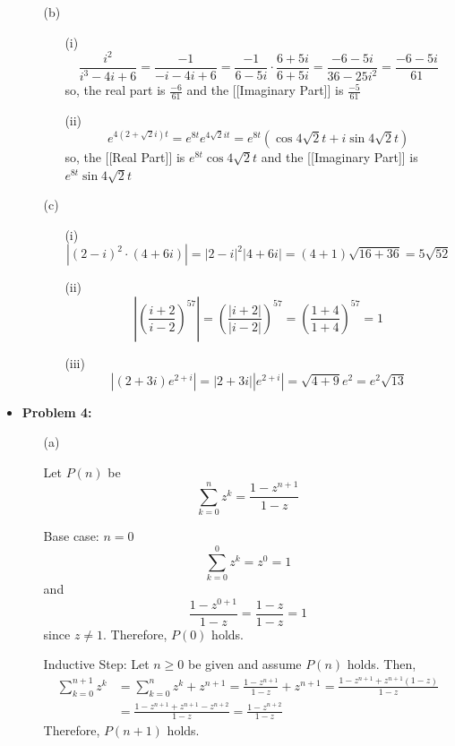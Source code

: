 \documentclass[12pt]{amsart}
\theoremstyle{definition}
\theoremstyle{remark}
\begin{document}
\begin{itemize}
\begin{itemize}
\vspace{0.1 cm}

\item[(b)] 
   \begin{itemize}
      \item[(i)] $$\frac{i^{2}}{i^{3}-4i+6}= \frac{-1}{-i-4i+6}= \frac{-1}{6-5i}\cdot \frac{6+5i}{6+5i}=\frac{-6-5i}{36-25i^{2}}= \frac{-6-5i}{61}$$so, the real part is $\frac{-6}{61}$ and the [[Imaginary Part]] is $\frac{-5}{61}$
        \vspace{0.1 cm}
      \item[(ii)]$$e^{4(2+\sqrt{2}i)t}=e^{8t}e^{4\sqrt{2}it}=e^{8t}(\cos4\sqrt{2}t+i\sin4\sqrt{2}t)$$so, the [[Real Part]] is $e^{8t}\cos 4\sqrt{2}t$ and the [[Imaginary Part]] is $e^{8t}\sin 4\sqrt{2}t$
   \end{itemize}
   
   \vspace{0.1 cm}
   
\item[(c)]
  \begin{itemize}
      \item[(i)]$$|(2-i)^{2}\cdot(4+6i)|=|2-i|^{2}|4+6i|=(4+1)\sqrt{16+36}=5\sqrt{52}$$
        \vspace{0.1 cm}
      \item[(ii)]$$\left|\left(\frac{i+2}{i-2}\right)^{57}\right|=\left(\frac{|i+2|}{|i-2|}\right)^{57}=\left(\frac{1+4}{1+4}\right)^{57}=1$$
        \vspace{0.1 cm}
      \item[(iii)]$$|(2+3i)e^{2+i}|=|2+3i||e^{2+i}|=\sqrt{4+9}e^{2}=e^{2}\sqrt{13}$$
  \end{itemize}   
\end{itemize}

\vspace{0.2 cm}

\item {\bf{Problem 4:}} 

\vspace{0.1 cm}
\begin{itemize}
\item[(a)]

Let $P(n)$ be $$\sum_{k=0}^{n}z^{k}= \frac{1-z^{n+1}}{1-z}$$

Base case: $n=0$
$$\sum_{k=0}^{0}z^{k}=z^{0}=1$$and $$\frac{1-z^{0+1}}{1-z}=\frac{1-z}{1-z}=1$$since $z\ne1$. Therefore, $P(0)$ holds.

Inductive Step: Let $n\ge0$ be given and assume $P(n)$ holds. 
Then, \begin{align*}\sum_{k=0}^{n+1}z^{k}&=\sum_{k=0}^{n}z^{k}+z^{n+1}= \frac{1-z^{n+1}}{1-z}+z^{n+1}=\frac{1-z^{n+1}+z^{n+1}(1-z)}{1-z}\\
&=\frac{1-z^{n+1}+z^{n+1}-z^{n+2}}{1-z}= \frac{1-z^{n+2}}{1-z}\end{align*}Therefore, $P(n+1)$ holds.


\end{itemize}
\end{itemize}
\end{document}
